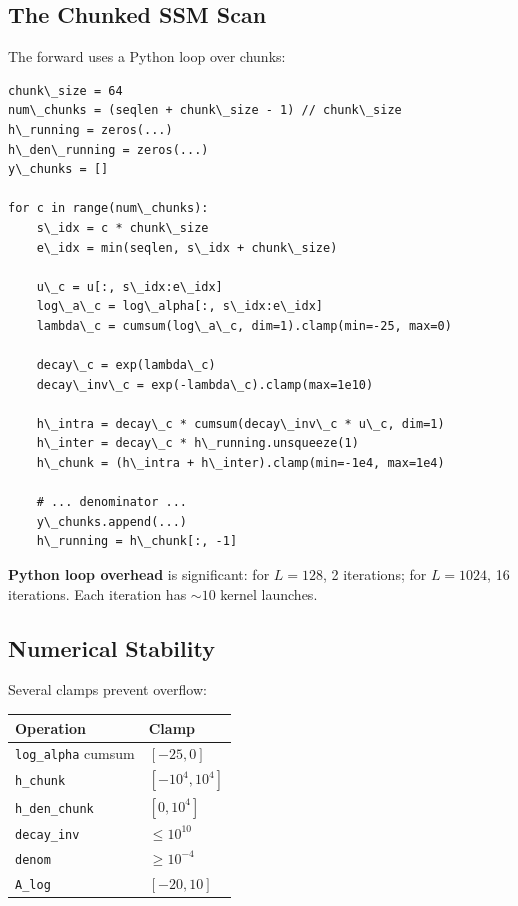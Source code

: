 \subsection{The Chunked SSM Scan}

The forward uses a Python loop over chunks:

\begin{lstlisting}
chunk\_size = 64
num\_chunks = (seqlen + chunk\_size - 1) // chunk\_size
h\_running = zeros(...)
h\_den\_running = zeros(...)
y\_chunks = []

for c in range(num\_chunks):
    s\_idx = c * chunk\_size
    e\_idx = min(seqlen, s\_idx + chunk\_size)
    
    u\_c = u[:, s\_idx:e\_idx]
    log\_a\_c = log\_alpha[:, s\_idx:e\_idx]
    lambda\_c = cumsum(log\_a\_c, dim=1).clamp(min=-25, max=0)
    
    decay\_c = exp(lambda\_c)
    decay\_inv\_c = exp(-lambda\_c).clamp(max=1e10)
    
    h\_intra = decay\_c * cumsum(decay\_inv\_c * u\_c, dim=1)
    h\_inter = decay\_c * h\_running.unsqueeze(1)
    h\_chunk = (h\_intra + h\_inter).clamp(min=-1e4, max=1e4)
    
    # ... denominator ...
    y\_chunks.append(...)
    h\_running = h\_chunk[:, -1]
\end{lstlisting}

\textbf{Python loop overhead} is significant: for $L = 128$, 2 iterations; for 
$L = 1024$, 16 iterations. Each iteration has $\sim 10$ kernel launches.

\subsection{Numerical Stability}

Several clamps prevent overflow:

\begin{table}[H]
\centering
\small
\begin{tabular}{ll}
\toprule
\textbf{Operation} & \textbf{Clamp} \\
\midrule
\texttt{log\_alpha} cumsum & $[-25, 0]$ \\
\texttt{h\_chunk} & $[-10^4, 10^4]$ \\
\texttt{h\_den\_chunk} & $[0, 10^4]$ \\
\texttt{decay\_inv} & $\leq 10^{10}$ \\
\texttt{denom} & $\geq 10^{-4}$ \\
\texttt{A\_log} & $[-20, 10]$ \\
\bottomrule
\end{tabular}
\end{table}

